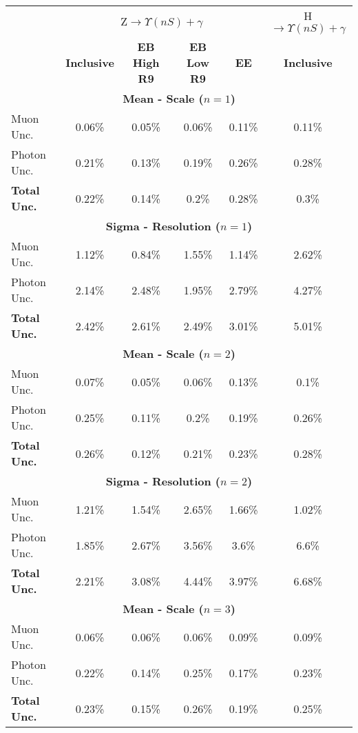 

\begin{tabular}{|l|c|c|c|c|c|}
\cline{2-6}
\multicolumn{1}{c|}{} & \multicolumn{4}{c|}{Z$\rightarrow \Upsilon(nS) + \gamma$} & H$\rightarrow \Upsilon(nS) + \gamma$ \\ \cline{2-6}
\multicolumn{1}{c|}{} & \textbf{Inclusive}  & \textbf{EB High R9}  & \textbf{EB Low R9}  & \textbf{EE} & \textbf{Inclusive}        \\ \hline \hline

\multicolumn{6}{|c|}{\textbf{Mean - Scale ($n=1$)}} \\ \hline
Muon Unc.           & 0.06\% & 0.05\% & 0.06\% & 0.11\% & 0.11\% \\ \hline
Photon Unc.         & 0.21\% & 0.13\% & 0.19\% & 0.26\% & 0.28\% \\ \hline
\textbf{Total Unc.} & 0.22\% & 0.14\% & 0.2\% & 0.28\% & 0.3\% \\ \hline 

\multicolumn{6}{|c|}{\textbf{Sigma - Resolution ($n=1$)}}            \\ \hline 
Muon Unc.           & 1.12\% & 0.84\% & 1.55\% & 1.14\% & 2.62\% \\ \hline
Photon Unc.         & 2.14\% & 2.48\% & 1.95\% & 2.79\% & 4.27\% \\ \hline
\textbf{Total Unc.} & 2.42\% & 2.61\% & 2.49\% & 3.01\% & 5.01\% \\ \hline \hline 


\multicolumn{6}{|c|}{\textbf{Mean - Scale ($n=2$)}} \\ \hline 
Muon Unc.           & 0.07\% & 0.05\% & 0.06\% & 0.13\% & 0.1\% \\ \hline
Photon Unc.         & 0.25\% & 0.11\% & 0.2\% & 0.19\% & 0.26\% \\ \hline
\textbf{Total Unc.} & 0.26\% & 0.12\% & 0.21\% & 0.23\% & 0.28\% \\ \hline 

\multicolumn{6}{|c|}{\textbf{Sigma - Resolution ($n=2$)}}            \\ \hline 
Muon Unc.           & 1.21\% & 1.54\% & 2.65\% & 1.66\% & 1.02\% \\ \hline
Photon Unc.         & 1.85\% & 2.67\% & 3.56\% & 3.6\% & 6.6\% \\ \hline
\textbf{Total Unc.} & 2.21\% & 3.08\% & 4.44\% & 3.97\% & 6.68\% \\ \hline \hline 


\multicolumn{6}{|c|}{\textbf{Mean - Scale ($n=3$)}}  \\ \hline 
Muon Unc.           & 0.06\% & 0.06\% & 0.06\% & 0.09\% & 0.09\% \\ \hline
Photon Unc.         & 0.22\% & 0.14\% & 0.25\% & 0.17\% & 0.23\% \\ \hline
\textbf{Total Unc.} & 0.23\% & 0.15\% & 0.26\% & 0.19\% & 0.25\% \\ \hline 


\end{tabular}
